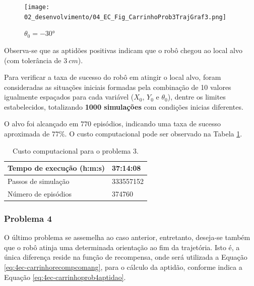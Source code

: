 \begin{figure}[H]
	\centering
	\texttt{[image: 02\_desenvolvimento/04\_EC\_Fig\_CarrinhoProb3TrajGraf3.png]}
	\caption{$\theta_0=\ang{-30}$}
	\label{fig:4ec-carrinhoprob3trajgraf3}
\end{figure}

Observa-se que as aptidões positivas indicam que o robô chegou ao local alvo (com tolerância de $\SI{3}{cm}$).


Para verificar a taxa de sucesso do robô em atingir o local alvo, foram consideradas as situações iniciais formadas pela combinação de 10 valores igualmente espaçados para cada variável ($X_0$, $Y_0$ e $\theta_0$), dentre os limites estabelecidos, totalizando \textbf{1000 simulações} com condições inicias diferentes.

O alvo foi alcançado em $770$ episódios, indicando uma taxa de sucesso aproximada de $77\%$. O custo computacional pode ser observado na Tabela \ref{tab:4ec-carrinhoprob3custocomp}.

\begin{table}[H]
	\centering
	\begin{tabular}{l|l} \toprule
		{{Tempo de execução (h:m:s)}} & {37:14:08} \\\midrule
		{{Passos de simulação}} & {333557152} \\\midrule
		{{Número de episódios}} & {374760} \\
		\bottomrule
	\end{tabular}
	\caption{Custo computacional para o problema 3.}\label{tab:4ec-carrinhoprob3custocomp}
\end{table}

\subsubsection{Problema 4}\label{sssec:4ec-carrinhoprob4}

O último problema se assemelha ao caso anterior, entretanto, deseja-se também que o robô atinja uma determinada orientação ao fim da trajetória. Isto é, a única diferença reside na função de recompensa, onde será utilizada a Equação \ref{eq:4ec-carrinhorecompcomang}, para o cálculo da aptidão, conforme indica a Equação \ref{eq:4ec-carrinhoprob4aptidao}.


